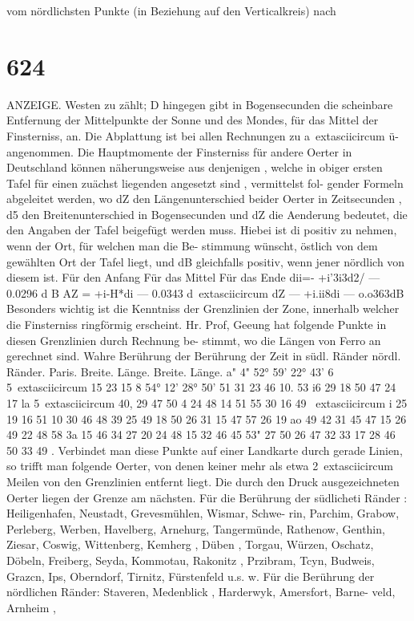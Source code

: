 \documentclass[12pt,a4paper]{article}
\begin{document}
{{{{{{{{vom   nördlichsten   Punkte   (in   Beziehung   auf  den   Verticalkreis)   nach


\section*{624}

ANZEIGE. Westen  zu  zählt;  D  hingegen  gibt  in  Bogensecunden  die  scheinbare  Entfernung  der  Mittelpunkte  der Sonne  und  des  Mondes,  für  das  Mittel  der  Finsterniss,  an.  Die  Abplattung  ist  bei  allen  Rechnungen zu  a\	extasciicircum{}{ }ü-  angenommen. Die  Hauptmomente  der  Finsterniss  für  andere  Oerter  in  Deutschland  können  näherungsweise  aus denjenigen ,  welche  in  obiger  ersten  Tafel  für  einen  zuächst  liegenden  angesetzt  sind ,  vermittelst  fol- gender Formeln  abgeleitet  werden,  wo  dZ  den  Längenunterschied  beider  Oerter  in  Zeitsecunden ,  d5 den  Breitenunterschied  in  Bogensecunden  und  dZ  die  Aenderung  bedeutet,  die  den  Angaben  der  Tafel beigefügt  werden  muss.  Hiebei  ist  di  positiv  zu  nehmen,  wenn  der  Ort,  für  welchen  man  die  Be- stimmung wünscht,  östlich  von  dem  gewählten  Ort  der  Tafel  liegt,  und  dB  gleichfalls  positiv,  wenn jener  nördlich  von  diesem  ist. Für  den  Anfang Für  das  Mittel Für  das  Ende dii=-  +i'3i3d2/  ---  0.0296  d  B AZ  =  +i-H*di  ---  0.0343  d\	extasciicircum{}{ } dZ  ---  +i.ii8di  --- o.o363dB Besonders  wichtig  ist  die  Kenntniss  der  Grenzlinien  der  Zone,  innerhalb  welcher  die  Finsterniss ringförmig  erscheint.  Hr.  Prof,  Geeung  hat  folgende  Punkte  in  diesen  Grenzlinien  durch  Rechnung  be- stimmt, wo  die  Längen  von  Ferro  an  gerechnet  sind. Wahre Berührung  der Berührung  der Zeit  in südl.  Ränder nördl. Ränder. Paris. Breite. Länge. Breite. Länge. a"    4" 52°  59' 22°  43' 6 5\	extasciicircum{}{ }     15 23     15 8 54°  12' 28°  50' 51     31 23     46 10. 53     i6 29     18 50     47 24     17 la 5\	extasciicircum{}{ }     40, 29     47 50      4 24    48 14 51     55 30     16 49     \	extasciicircum{}{ }i 25     19 16 51     10 30    46 48     39 25     49 18 50     26 31     15 47     57 26     19 ao 49     42 31     45 47     15 26     49 22 48     58 3a     15 46     34 27     20 24 48     15 32     46 45     53" 27     50 26 47     32 33     17 28 46     50 33     49 . Verbindet  man  diese  Punkte  auf  einer  Landkarte  durch  gerade  Linien,  so  trifft  man  folgende  Oerter, von  denen  keiner  mehr  als  etwa  2\	extasciicircum{}{ }  Meilen  von  den  Grenzlinien  entfernt  liegt.  Die  durch  den  Druck ausgezeichneten  Oerter  liegen  der  Grenze  am  nächsten. Für  die  Berührung  der  südlicheti  Ränder :  Heiligenhafen,  Neustadt,  Grevesmühlen,  Wismar,  Schwe- rin, Parchim,  Grabow,  Perleberg,  Werben,  Havelberg,  Arnehurg,  Tangermünde,  Rathenow,  Genthin, Ziesar,  Coswig,  Wittenberg,  Kemherg ,  Düben ,  Torgau,  Würzen,  Oschatz,  Döbeln,  Freiberg,  Seyda, Kommotau,  Rakonitz ,  Przibram,   Tcyn,  Budweis,  Grazcn,  Ips,   Oberndorf,  Tirnitz,  Fürstenfeld  u.s.  w. Für  die  Berührung  der  nördlichen  Ränder:  Staveren,  Medenblick ,  Harderwyk,  Amersfort,  Barne- veld,  Arnheim ,  }}}}}}}}
\end{document}
